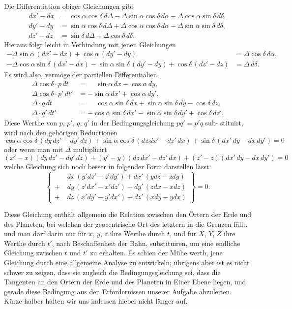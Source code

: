 \documentclass[12pt,a4paper]{article}
\begin{document}
Die Differentiation obiger Gleichungen gibt
\begin{align*}
dx' - dx &= \cos\alpha\cos\delta\,d\Delta - \Delta\sin\alpha\cos\delta\,d\alpha - \Delta\cos\alpha\sin\delta\,d\delta,\\
dy' - dy &= \sin\alpha\cos\delta\,d\Delta + \Delta\cos\alpha\cos\delta\,d\alpha - \Delta\sin\alpha\sin\delta\,d\delta,\\
dz' - dz &= \sin\delta\,d\Delta + \Delta\cos\delta\,d\delta.
\end{align*}
Hieraus folgt leicht in Verbindung mit jenen Gleichungen
\begin{align*}
-\Delta\sin\alpha\,(dx'-dx) + \cos\alpha\,(dy'-dy) &= \Delta\cos\delta\,d\alpha,\\
-\Delta\cos\alpha\sin\delta\,(dx'-dx) - \sin\alpha\sin\delta\,(dy'-dy) + \cos\delta\,(dz'-dz) &= \Delta\,d\delta.
\end{align*}
Es wird also, vermöge der partiellen Differentialien,
\begin{align*}
\Delta\cos\delta\cdot p\,dt &= \phantom{-}\sin\alpha\,dx - \cos\alpha\,dy,\\
\Delta\cos\delta\cdot p'\,dt' &= -\sin\alpha\,dx' + \cos\alpha\,dy',\\
\Delta\cdot q\,dt &= \phantom{-}\cos\alpha\sin\delta\,dx + \sin\alpha\sin\delta\,dy - \cos\delta\,dz,\\
\Delta\cdot q'\,dt' &= -\cos\alpha\sin\delta\,dx' - \sin\alpha\sin\delta\,dy' + \cos\delta\,dz'.
\end{align*}
Diese Werthe von $p$, $p'$, $q$, $q'$ in der Bedingungsgleichung $pq' = p'q$ sub-
stituirt, wird nach den gehörigen Reductionen
\[
\cos\alpha\cos\delta\,(dy\,dz' - dy'\,dz) + \sin\alpha\cos\delta\,(dz\,dx' - dz'\,dx) + \sin\delta\,(dx'\,dy - dx\,dy') = 0
\]
oder wenn man mit $\Delta$ multiplicirt
\[
(x'-x)(dy\,dz' - dy'\,dz) + (y'-y)(dz\,dx' - dz'\,dx) + (z'-z)(dx'\,dy - dx\,dy') = 0
\]
welche Gleichung sich noch besser in folgender Form darstellen lässt:
\begin{equation*}
\left\{\begin{aligned}
&dx\,(y'dz' - z'dy') + dx'\,(ydz - zdy)\\
+\;&dy\,(z'dx' - x'dz') + dy'\,(zdx - xdz)\\
+\;&dz\,(x'dy' - y'dx') + dz'\,(xdy - ydx)
\end{aligned}\right\} = 0.
\end{equation*}

Diese Gleichung enthält allgemein die Relation zwischen den Örtern der
Erde und des Planeten, bei welchen der geocentrische Ort des letztern in die
Grenzen fällt, und man darf darin nur für $x$, $y$, $z$ ihre Werthe durch $t$, und
für $X$, $Y$, $Z$ ihre Werthe durch $t'$, nach Beschaffenheit der Bahn, substituiren,
um eine endliche Gleichung zwischen $t$ und $t'$ zu erhalten. Es schien der Mühe
werth, jene Gleichung durch eine allgemeine Analyse zu entwickeln; übrigens
aber ist es nicht schwer zu zeigen, dass sie zugleich die Bedingungsgleichung sei,
dass die Tangenten an den Ortern der Erde und des Planeten in Einer Ebene liegen,
und gerade diese Bedingung aus den Erfordernissen unserer Aufgabe abzuleiten.
Kürze halber halten wir uns indessen hiebei nicht länger auf.
\end{document}
